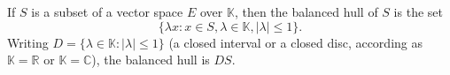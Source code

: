 If $S$ is a subset of a vector space $E$ over $\mathbb{K}$, then the balanced hull of $S$ is the set
$$\{\lambda x : x \in S, \lambda \in \mathbb{K}, |\lambda| \leq 1\}.$$
Writing $D = \{\lambda \in \mathbb{K} : |\lambda| \leq 1\}$ (a closed interval or a closed disc, according as $\mathbb{K} = \mathbb{R}$ or $\mathbb{K} = \mathbb{C}$), the balanced hull is $DS$.

